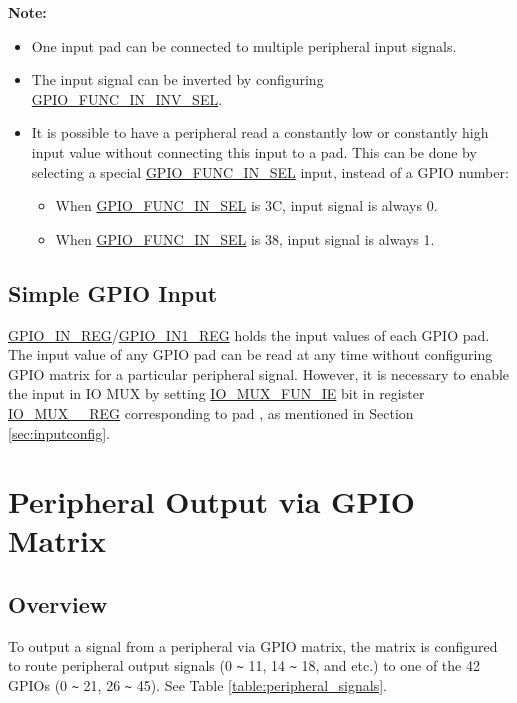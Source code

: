 \documentclass[main\_\_EN.tex]{subfiles}
\begin{document}
{\bfseries Note:}
\begin{itemize}
\item One input pad can be connected to multiple peripheral input signals.
\item The input signal can be inverted by configuring \hyperref[fielddesc:GPIOFUNCNININVSEL]{GPIO\_FUNC\_IN\_INV\_SEL}.
\item It is possible to have a peripheral read a constantly low or constantly high input value without connecting this input to a pad. This can be done by selecting a special \hyperref[fielddesc:GPIOFUNCNINSEL]{GPIO\_FUNC\_IN\_SEL} input, instead of a GPIO number:
\begin {itemize}
\item When \hyperref[fielddesc:GPIOFUNCNINSEL]{GPIO\_FUNC\_IN\_SEL} is \hexprefix{}3C, input signal  is always 0.
\item When \hyperref[fielddesc:GPIOFUNCNINSEL]{GPIO\_FUNC\_IN\_SEL} is \hexprefix{}38, input signal  is always 1.
\end {itemize}
\end{itemize}

\subsection{Simple GPIO Input}\label{IOMUXSimpleGPIOInput}

\hyperref[regdesc:GPIOINREG]{GPIO\_IN\_REG}/\hyperref[regdesc:GPIOIN1REG]{GPIO\_IN1\_REG} holds the input values of each GPIO pad. The input value of any GPIO pad can be read at any time without configuring GPIO matrix for a particular peripheral signal. However, it is necessary to enable the input in IO MUX by setting \hyperref[fielddesc:IOMUXFUNIE]{IO\_MUX\_FUN\_IE} bit in register \hyperref[regdesc:IOMUXnREG]{IO\_MUX\_\_REG} corresponding to pad , as mentioned in Section \ref{sec:inputconfig}.

\section{Peripheral Output via GPIO Matrix}

\subsection{Overview}

To output a signal from a peripheral via GPIO matrix, the matrix is configured to route peripheral output signals (0 \verb+~+ 11, 14 \verb+~+ 18, and etc.) to one of the 42 GPIOs (0 \verb+~+ 21, 26 \verb+~+ 45). See Table \ref{table:peripheral_signals}.
\end{document}
